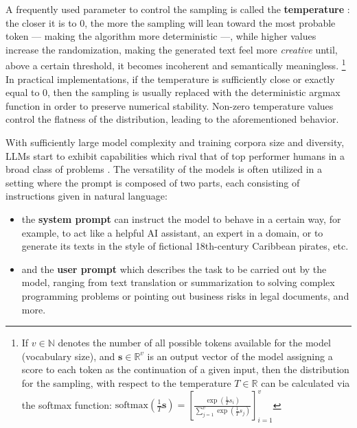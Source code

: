 \documentclass[noindent,nohyp,parspace,titlepage,twoside,12pt]{article}
\begin{document}
      A frequently used parameter to control the sampling is called the
      \textbf{temperature} \cite{temperature}: the closer it is to 0, the more
      the sampling will lean toward the most probable token --- making the
      algorithm more deterministic ---, while higher values increase the
      randomization, making the generated text feel more \emph{creative} until,
      above a certain threshold, it becomes incoherent and semantically
      meaningless. \footnote{If $v \in \mathbb{N}$ denotes the number of all
      possible tokens available for the model (vocabulary size), and
      $\mathbf{s} \in \mathbb{R}^v$ is an output vector of the model assigning
      a score to each token as the continuation of a given input, then the
      distribution for the sampling, with respect to the temperature $T \in
      \mathbb{R}$ can be calculated via the softmax function:
      $\text{softmax}\left(\frac{1}{T} \mathbf{s}\right) = \left[
      \frac{\exp(\frac{1}{T} s_i)}{\sum_{j=1}^v \exp(\frac{1}{T} s_j)}
      \right]_{i=1}^v$} In practical implementations, if the temperature is
      sufficiently close or exactly equal to $0$, then the sampling is usually
      replaced with the deterministic argmax function in order to preserve
      numerical stability. Non-zero temperature values control the flatness of
      the distribution, leading to the aforementioned behavior.

      With sufficiently large model complexity and training corpora size and
      diversity, LLMs start to exhibit capabilities which rival that of top
      performer humans in a broad class of problems \cite{gpt3,gpt4}. The
      versatility of the models is often utilized in a setting where the prompt
      is composed of two parts, each consisting of instructions given in
      natural language:

      \begin{itemize}
        \item the \textbf{system prompt} can instruct the model to behave in a
              certain way, for example, to act like a helpful AI assistant,
              an expert in a domain, or to generate its texts in the style of
              fictional 18th-century Caribbean pirates, etc.

        \item and the \textbf{user prompt} which describes the task to be
              carried out by the model, ranging from text translation or
              summarization to solving complex programming problems or pointing
              out business risks in legal documents, and more.
      \end{itemize}
\end{document}
